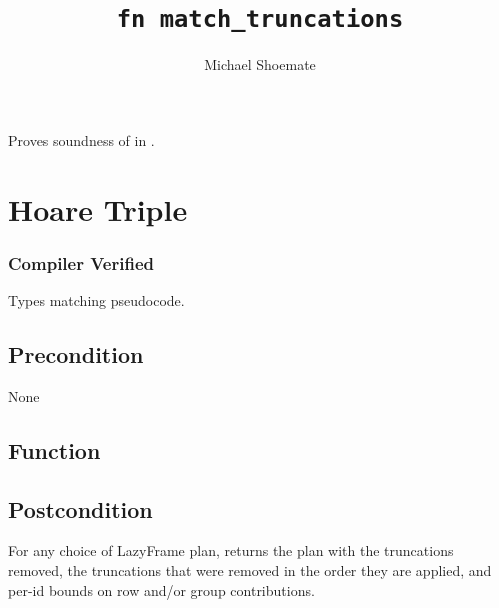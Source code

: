 \documentclass{article}
\title{\texttt{fn match\_truncations}}
\author{Michael Shoemate}
\begin{document}
\maketitle  


\contrib

Proves soundness of  
in .

\section{Hoare Triple}
\subsubsection*{Compiler Verified}
Types matching pseudocode.

\subsection*{Precondition}
None 

\subsection*{Function}
\label{sec:python-pseudocode}


\subsection*{Postcondition}
\begin{theorem}[Postcondition]
    For any choice of LazyFrame plan,
    returns the plan with the truncations removed,
    the truncations that were removed in the order they are applied,
    and per-id bounds on row and/or group contributions.
\end{theorem}
\end{document}
